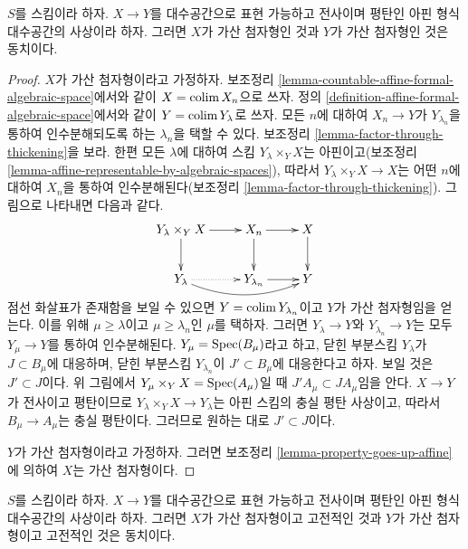 \begin{lemma}
\label{lemma-iff-countably-indexed}
$S$를 스킴이라 하자. $X \to Y$를 대수공간으로 표현 가능하고
전사이며 평탄인 아핀 형식 대수공간의 사상이라 하자. 그러면
$X$가 가산 첨자형인 것과 $Y$가 가산 첨자형인 것은 동치이다.
\end{lemma}

\begin{proof}
$X$가 가산 첨자형이라고 가정하자. 보조정리
\ref{lemma-countable-affine-formal-algebraic-space}에서와 같이
$X = \mathop{\mathrm{colim}}\nolimits X_n$으로 쓰자. 정의
\ref{definition-affine-formal-algebraic-space}에서와 같이
$Y = \mathop{\mathrm{colim}}\nolimits Y_\lambda$로 쓰자. 모든 $n$에 대하여
$X_n \to Y$가 $Y_{\lambda_n}$을 통하여 인수분해되도록 하는
$\lambda_n$을 택할 수 있다. 보조정리
\ref{lemma-factor-through-thickening}을 보라. 한편 모든 $\lambda$에
대하여 스킴 $Y_\lambda \times_Y X$는 아핀이고(보조정리
\ref{lemma-affine-representable-by-algebraic-spaces}), 따라서
$Y_\lambda \times_Y X \to X$는 어떤 $n$에 대하여 $X_n$을 통하여
인수분해된다(보조정리 \ref{lemma-factor-through-thickening}).
그림으로 나타내면 다음과 같다.
$$
\xymatrix{
Y_\lambda \times_Y X \ar[r] \ar[d] & X_n \ar[r] \ar[d] & X \ar[d] \\
Y_\lambda \ar@{..>}[r] \ar@/_1pc/[rr] & Y_{\lambda_n} \ar[r] & Y
}
$$
점선 화살표가 존재함을 보일 수 있으면
$Y = \mathop{\mathrm{colim}}\nolimits Y_{\lambda_n}$이고 $Y$가 가산 첨자형임을 얻는다.
이를 위해 $\mu \geq \lambda$이고 $\mu \geq \lambda_n$인 $\mu$를
택하자. 그러면 $Y_\lambda \to Y$와 $Y_{\lambda_n} \to Y$는 모두
$Y_\mu \to Y$를 통하여 인수분해된다.
$Y_\mu = \mathop{\mathrm{Spec}}(B_\mu)$라고 하고, 닫힌 부분스킴 $Y_\lambda$가
$J \subset B_\mu$에 대응하며, 닫힌 부분스킴 $Y_{\lambda_n}$이
$J' \subset B_\mu$에 대응한다고 하자. 보일 것은
$J' \subset J$이다. 위 그림에서
$Y_\mu \times_Y X = \mathop{\mathrm{Spec}}(A_\mu)$일 때
$J'A_\mu \subset JA_\mu$임을 안다. $X \to Y$가 전사이고
평탄이므로 $Y_\lambda \times_Y X \to Y_\lambda$는 아핀 스킴의
충실 평탄 사상이고, 따라서 $B_\mu \to A_\mu$는 충실 평탄이다.
그러므로 원하는 대로 $J' \subset J$이다.

\medskip\noindent
$Y$가 가산 첨자형이라고 가정하자. 그러면 보조정리
\ref{lemma-property-goes-up-affine}에 의하여 $X$는 가산 첨자형이다.
\end{proof}

\begin{lemma}
\label{lemma-iff-cic}
$S$를 스킴이라 하자. $X \to Y$를 대수공간으로 표현 가능하고
전사이며 평탄인 아핀 형식 대수공간의 사상이라 하자. 그러면
$X$가 가산 첨자형이고 고전적인 것과 $Y$가 가산 첨자형이고
고전적인 것은 동치이다.
\end{lemma}

